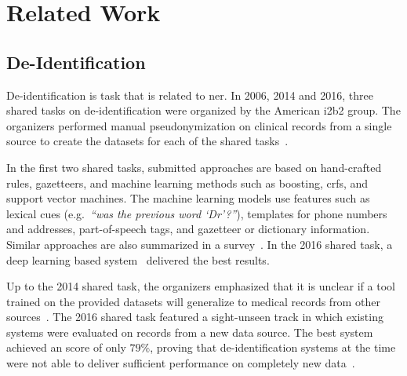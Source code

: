 
\section{Related Work}\label{sec:related}

\subsection{De-Identification}
De-identification is  task that is related to \ac{ner}.
%
In 2006, 2014 and 2016, three shared tasks on de-identification were organized by the American i2b2 group.
%
The organizers performed manual pseudonymization on clinical records from a single source to create the datasets for each of the shared tasks~\citep{stubbs2015annotating}.

%
In the first two shared tasks, submitted approaches are based on hand-crafted rules, gazetteers, and machine learning methods such as boosting, \acp{crf}, and support vector machines.
%
The machine learning models use features such as lexical cues (e.g.\ \textit{``was the previous word `Dr'?''}), templates for phone numbers and addresses, part-of-speech tags, and gazetteer or dictionary information.
%
Similar approaches are also summarized in a survey~\citep{meystre2010automatic}.
%
In the 2016 shared task, a deep learning based system~\citep{liu2017identification} delivered the best results.

%
Up to the 2014 shared task, the organizers emphasized that it is unclear if a tool trained on the provided datasets will generalize to medical records from other sources~\citep{uzuner2007evaluating,stubbs2015automated}.
%
The 2016 shared task featured a sight-unseen track in which existing systems were evaluated on records from a new data source.
%
The best system achieved an \fone score of only $79\%$, proving that de-identification systems at the time were not able to deliver sufficient performance on completely new data~\citep{stubbs2017identification}.

